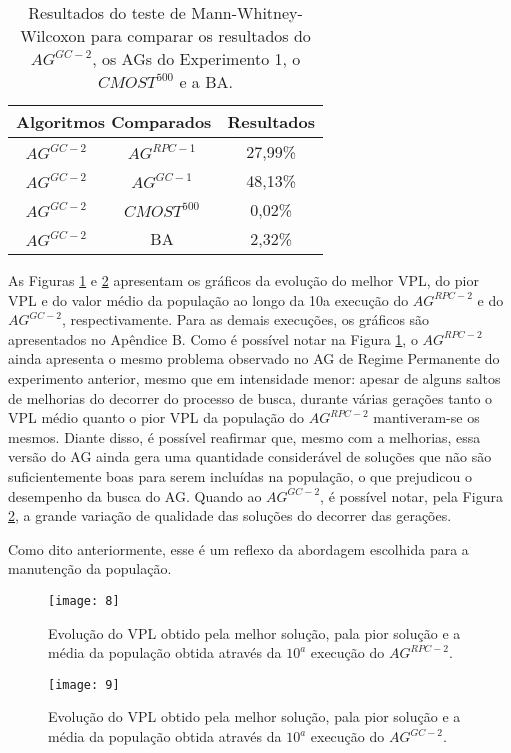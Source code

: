 \begin{table}[htb]
\centering
\caption{Resultados do teste de Mann-Whitney-Wilcoxon para comparar os resultados do $AG^{GC-2}$, os AGs do Experimento 1, o $CMOST^{500}$ e a BA.}
\label{tab:mw2_2}
\begin{tabular}{|c|c|c|}
\hline
\multicolumn{2}{|c|}{Algoritmos Comparados} & Resultados \\ \hline
$AG^{GC-2}$ & $AG^{RPC-1}$ & 27,99\% \\ \hline
$AG^{GC-2}$ & $AG^{GC-1}$ & 48,13\% \\ \hline
$AG^{GC-2}$ & $CMOST^{500}$ & 0,02\% \\ \hline
$AG^{GC-2}$ & BA & 2,32\% \\ \hline

\end{tabular}
\end{table}

As Figuras \ref{fig:graph2_1} e \ref{fig:graph2_2} apresentam os gráficos da evolução do melhor VPL, do pior VPL e do valor médio da população ao longo da 10a execução do $AG^{RPC-2}$ e do $AG^{GC-2}$, respectivamente. Para as demais execuções, os gráficos são apresentados no Apêndice B.  Como é possível notar na Figura \ref{fig:graph2_1}, o $AG^{RPC-2}$ ainda apresenta o mesmo problema observado no AG de Regime Permanente do experimento anterior, mesmo que em intensidade menor: apesar de alguns saltos de melhorias do decorrer do processo de busca, durante várias gerações tanto o VPL médio quanto o pior VPL da população do $AG^{RPC-2}$ mantiveram-se os mesmos. Diante disso, é possível reafirmar que, mesmo com a melhorias, essa versão do AG ainda gera uma quantidade considerável de soluções que não são suficientemente boas para serem incluídas na população, o que prejudicou o desempenho da busca do AG. Quando ao $AG^{GC-2}$, é possível notar, pela Figura \ref{fig:graph2_2}, a grande variação de qualidade das soluções do decorrer das gerações. 

Como dito anteriormente, esse é um reflexo da abordagem escolhida para a manutenção da população.

\begin{figure}[H]
\centering
\texttt{[image: 8]}
\caption{Evolução do VPL obtido pela melhor solução, pala pior solução e a média da população obtida através da $10^a$ execução do $AG^{RPC-2}$.}
\label{fig:graph2_1}
\end{figure}

\begin{figure}[H]
\centering
\texttt{[image: 9]}
\label{fig:graph2_2}
\caption{Evolução do VPL obtido pela melhor solução, pala pior solução e a média da população obtida através da $10^a$ execução do $AG^{GC-2}$.}

\end{figure}

